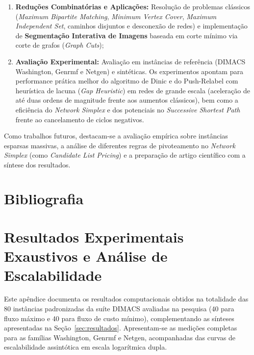 \documentclass[12pt,a4paper]{article}
\begin{document}
\begin{enumerate}[leftmargin=1.5em, itemsep=0.2em, topsep=0.2em, parsep=0em]
    \item \textbf{Reduções Combinatórias e Aplicações:} Resolução de problemas clássicos (\textit{Maximum Bipartite Matching}, \textit{Minimum Vertex Cover}, \textit{Maximum Independent Set}, caminhos disjuntos e desconexão de redes) e implementação de \textbf{Segmentação Interativa de Imagens} baseada em corte mínimo via corte de grafos (\textit{Graph Cuts});

    \item \textbf{Avaliação Experimental:} Avaliação em instâncias de referência (DIMACS Washington, Genrmf e Netgen) e sintéticas. Os experimentos apontam para performance prática melhor do algoritmo de Dinic e do Push-Relabel com heurística de lacuna (\textit{Gap Heuristic}) em redes de grande escala (aceleração de até duas ordens de magnitude frente aos aumentos clássicos), bem como a eficiência do \textit{Network Simplex} e dos potenciais no \textit{Successive Shortest Path} frente ao cancelamento de ciclos negativos.
\end{enumerate}

Como trabalhos futuros, destacam-se a avaliação empírica sobre instâncias esparsas massivas, a análise de diferentes regras de pivoteamento no \textit{Network Simplex} (como \textit{Candidate List Pricing}) e a preparação de artigo científico com a síntese dos resultados.

\newpage

\section{Bibliografia}



\newpage

\appendix
\renewcommand{\theHsection}{apendice.\arabic{section}}
\providecommand{\apendice}[1]{\section{#1}}

\apendice{Resultados Experimentais Exaustivos e Análise de Escalabilidade}
\label{ap:benchmarks_completos}

Este apêndice documenta os resultados computacionais obtidos na totalidade das 80 instâncias padronizadas da suíte DIMACS avaliadas na pesquisa (40 para fluxo máximo e 40 para fluxo de custo mínimo), complementando as sínteses apresentadas na Seção~\ref{sec:resultados}. Apresentam-se as medições completas para as famílias Washington, Genrmf e Netgen, acompanhadas das curvas de escalabilidade assintótica em escala logarítmica dupla.
\end{document}
